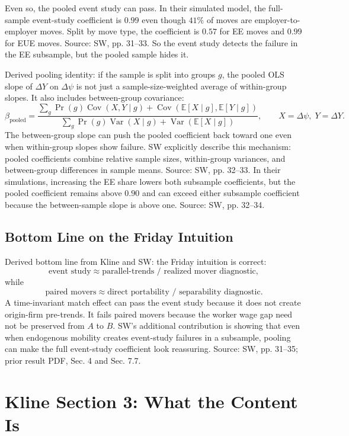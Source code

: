 \documentclass[11pt]{article}
\newcommand{\E}{\mathbb{E}}
\newcommand{\Var}{\operatorname{Var}}
\newcommand{\Cov}{\operatorname{Cov}}
\begin{document}
Even so, the pooled event study can pass. In their simulated model, the full-sample
event-study coefficient is $0.99$ even though $41\%$ of moves are employer-to-employer
moves. Split by move type, the coefficient is $0.57$ for EE moves and $0.99$ for
EUE moves. Source: SW, pp. 31--33. So the event study detects the failure in the
EE subsample, but the pooled sample hides it.

Derived pooling identity: if the sample is split into groups $g$, the pooled
OLS slope of $\Delta Y$ on $\Delta\psi$ is not just a sample-size-weighted average
of within-group slopes. It also includes between-group covariance:
\[
\beta_{\text{pooled}}
=
\frac{\sum_g \Pr(g)\Cov(X,Y\mid g)
+\Cov(\E[X\mid g],\E[Y\mid g])}
{\sum_g \Pr(g)\Var(X\mid g)+\Var(\E[X\mid g])},
\qquad X=\Delta\psi,\;Y=\Delta Y.
\]
The between-group slope can push the pooled coefficient back toward one even when
within-group slopes show failure. SW explicitly describe this mechanism: pooled
coefficients combine relative sample sizes, within-group variances, and between-group
differences in sample means. Source: SW, pp. 32--33. In their simulations, increasing
the EE share lowers both subsample coefficients, but the pooled coefficient remains
above $0.90$ and can exceed either subsample coefficient because the between-sample
slope is above one. Source: SW, pp. 32--34.

\subsection{Bottom Line on the Friday Intuition}

Derived bottom line from Kline and SW: the Friday intuition is correct:
\[
\text{event study} \approx \text{parallel-trends / realized mover diagnostic},
\]
while
\[
\text{paired movers} \approx \text{direct portability / separability diagnostic}.
\]
A time-invariant match effect can pass the event study because it does not create
origin-firm pre-trends. It fails paired movers because the worker wage gap need not
be preserved from $A$ to $B$. SW's additional contribution is showing that even when
endogenous mobility creates event-study failures in a subsample, pooling can make the
full event-study coefficient look reassuring. Source: SW, pp. 31--35; prior result
PDF, Sec. 4 and Sec. 7.7.

\section{Kline Section 3: What the Content Is}
\end{document}
